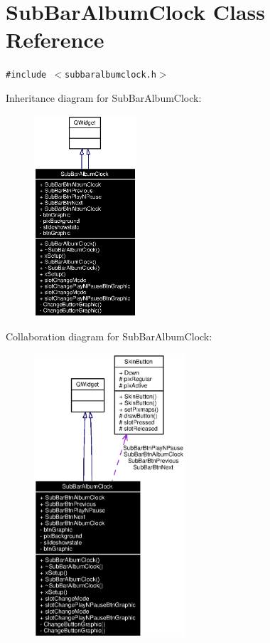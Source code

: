 \section{Sub\-Bar\-Album\-Clock Class Reference}
\label{classSubBarAlbumClock}
{\tt \#include $<$subbaralbumclock.h$>$}

Inheritance diagram for Sub\-Bar\-Album\-Clock:\begin{figure}[H]
\begin{center}
\leavevmode
\includegraphics[width=108pt]{classSubBarAlbumClock__inherit__graph}
\end{center}
\end{figure}
Collaboration diagram for Sub\-Bar\-Album\-Clock:\begin{figure}[H]
\begin{center}
\leavevmode
\includegraphics[width=159pt]{classSubBarAlbumClock__coll__graph}
\end{center}
\end{figure}


